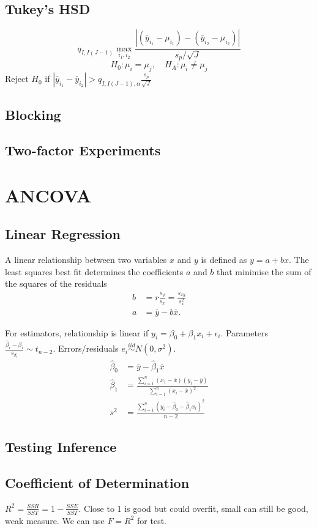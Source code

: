 \documentclass{article}
\begin{document}
\begin{multicols}{3}
\subsection{Tukey's HSD}
\[
    q_{I,I(J-1)}\max_{i_1,i_2}\frac{|(\bar{y}_{i_1}-\mu_{i_1})-(\bar{y}_{i_2}-\mu_{i_2})|}{s_p/\sqrt{J}}
\]
\[
    H_0: \mu_i = \mu_j, \quad H_A: \mu_i \ne \mu_j
\]
Reject \(H_0\) if \(|\bar{y}_{i_1}-\bar{y}_{i_2}|>q_{I,I(J-1),\alpha}\frac{s_p}{\sqrt{J}}\)
\subsection{Blocking}
\subsection{Two-factor Experiments}
\section{ANCOVA}
\subsection{Linear Regression}
A linear relationship between two variables \(x\) and \(y\) is defined as
\(
    y = a + b x.
    \)
The least squares best fit determines the coefficients \(a\) and \(b\) that minimise the sum of the squares of the residuals
\begin{align*}
    b & = r \frac{s_y}{s_x} = \frac{s_{xy}}{s_x^2} \\
    a & = \overline{y} - b \overline{x}.
\end{align*}

For estimators, relationship is linear if \(y_i = \beta_0+\beta_1x_i+\epsilon_i\).
Parameters \(\frac{\hat{\beta}_i-\beta_i}{s_{\beta_i}}\sim t_{n-2}\).
Errors/residuals \(e_i\stackrel{iid}{\sim}N(0,\sigma^2)\).
\begin{align*}
    \hat{\beta}_0 & = \bar{y}-\hat{\beta}_1\bar{x}\\
    \hat{\beta}_1 & =
    \frac{\sum_{i=1}^n(x_1-\bar{x})(y_i-\bar{y})}{\sum_{i=1}^n(x_i-\bar{x})^2}\\
    s^2 & =
    \frac{\sum_{i=1}^n(y_i-\hat{\beta}_0-\hat{\beta}_1x_i)^2}{n-2}
\end{align*}
\subsection{Testing Inference}
\subsection{Coefficient of Determination}
\(R^2 = \frac{SSR}{SST} = 1-\frac{SSE}{SST}\).
Close to 1 is good but could overfit, small can still be good, weak measure.
We can use \(F=R^2\) for test.

\end{multicols}
\end{document}
